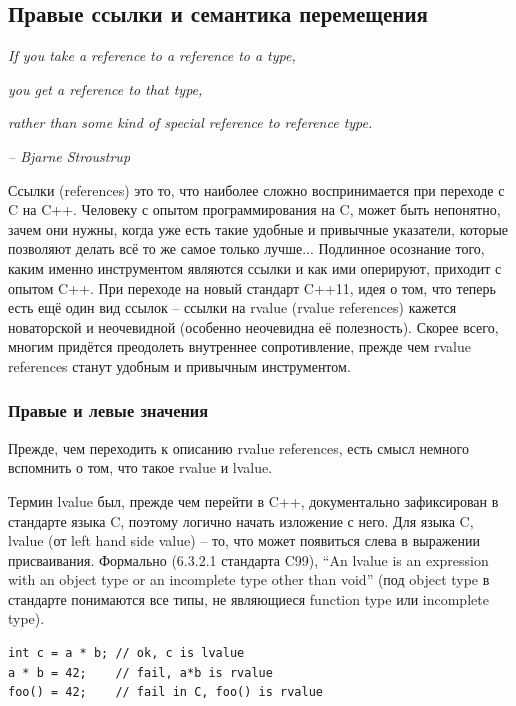 \documentclass[a4paper,12pt,oneside]{article}
\begin{document}
\pagebreak
\subsection{Правые ссылки и семантика перемещения}

\hfill\textit{If you take a reference to a reference to a type,}

\hfill\textit{you get a reference to that type,}

\hfill\textit{rather than some kind of special reference to reference type.} {\vspace{0.5em}}

\hfill\textit{-- Bjarne Stroustrup}

Ссылки (references) это то, что наиболее сложно воспринимается при переходе с C на C++. Человеку с опытом программирования на C, может быть непонятно, зачем они нужны, когда уже есть такие удобные и привычные указатели, которые позволяют делать всё то же самое только лучше... Подлинное осознание того, каким именно инструментом являются ссылки и как ими оперируют, приходит с опытом C++. При переходе на новый стандарт C++11, идея о том, что теперь есть ещё один вид ссылок -- ссылки на rvalue (rvalue references) кажется новаторской и неочевидной (особенно неочевидна её полезность). Скорее всего, многим придётся преодолеть внутреннее сопротивление, прежде чем rvalue references станут удобным и привычным инструментом. 

\subsubsection{Правые и левые значения}\label{LRvaluesAgain}

Прежде, чем переходить к описанию rvalue references, есть смысл немного вспомнить о том, что такое rvalue и lvalue.

Термин lvalue был, прежде чем перейти в C++, документально зафиксирован в стандарте языка C, поэтому логично начать изложение с него. Для языка C, lvalue (от left hand side value) -- то, что может появиться слева в выражении присваивания. Формально (6.3.2.1 стандарта C99), ``An lvalue is an expression with an object type or an incomplete type other than void'' (под object type в стандарте понимаются все типы, не являющиеся function type или incomplete type).

\begin{lstlisting}
int c = a * b; // ok, c is lvalue
a * b = 42;    // fail, a*b is rvalue
foo() = 42;    // fail in C, foo() is rvalue
\end{lstlisting}
\end{document}

